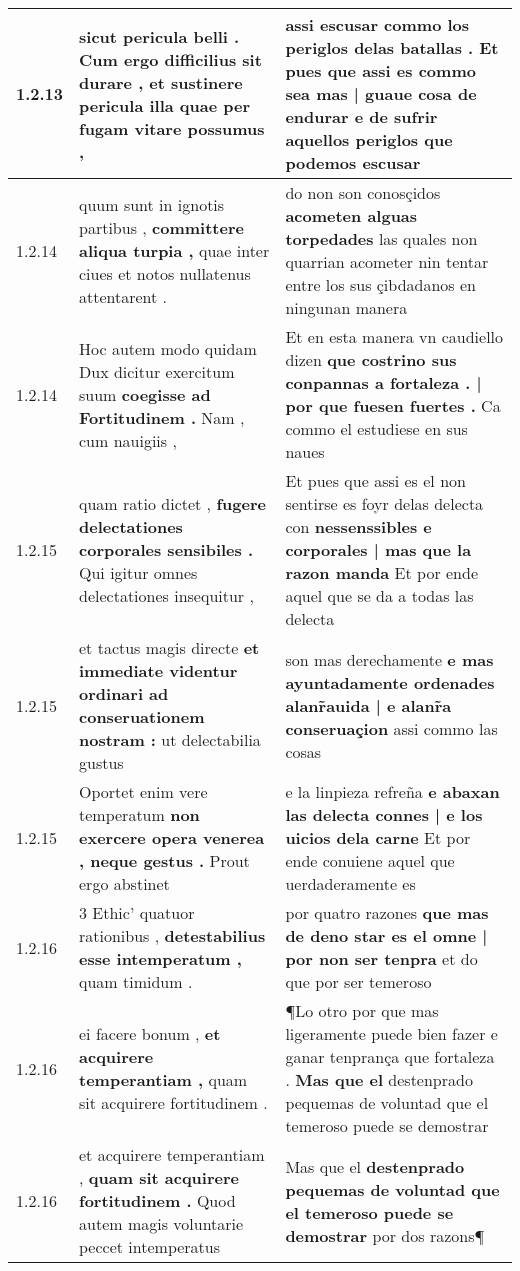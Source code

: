 \begin{tabular}{|p{1cm}|p{6.5cm}|p{6.5cm}|}
1.2.13 & sicut pericula belli . \textbf{ Cum ergo difficilius sit durare , et sustinere pericula illa } quae per fugam vitare possumus , & assi escusar commo los periglos delas batallas . \textbf{ Et pues que assi es commo sea mas | guaue cosa de endurar } e de sufrir aquellos periglos que podemos escusar \\\hline
1.2.14 & quum sunt in ignotis partibus , \textbf{ committere aliqua turpia , } quae inter ciues et notos nullatenus attentarent . & do non son conosçidos \textbf{ acometen alguas torpedades } las quales non quarrian acometer nin tentar entre los sus çibdadanos en ningunan manera \\\hline
1.2.14 & Hoc autem modo quidam Dux dicitur exercitum suum \textbf{ coegisse ad Fortitudinem . } Nam , cum nauigiis , & Et en esta manera vn caudiello dizen \textbf{ que costrino sus conpannas a fortaleza . | por que fuesen fuertes . } Ca commo el estudiese en sus naues \\\hline
1.2.15 & quam ratio dictet , \textbf{ fugere delectationes corporales sensibiles . } Qui igitur omnes delectationes insequitur , & Et pues que assi es el non sentirse es foyr delas delecta con \textbf{ nessenssibles e corporales | mas que la razon manda } Et por ende aquel que se da a todas las delecta \\\hline
1.2.15 & et tactus magis directe \textbf{ et immediate videntur ordinari ad conseruationem nostram : } ut delectabilia gustus & son mas derechamente \textbf{ e mas ayuntadamente ordenades alanr̃auida | e alanr̃a conseruaçion } assi commo las cosas \\\hline
1.2.15 & Oportet enim vere temperatum \textbf{ non exercere opera venerea , neque gestus . } Prout ergo abstinet & e la linpieza refreña \textbf{ e abaxan las delecta connes | e los uicios dela carne } Et por ende conuiene aquel que uerdaderamente es \\\hline
1.2.16 & 3 Ethic’ quatuor rationibus , \textbf{ detestabilius esse intemperatum , } quam timidum . & por quatro razones \textbf{ que mas de deno star es el omne | por non ser tenpra } et do que por ser temeroso \\\hline
1.2.16 & ei facere bonum , \textbf{ et acquirere temperantiam , } quam sit acquirere fortitudinem . & ¶Lo otro por que mas ligeramente puede bien fazer e ganar tenprança que fortaleza . \textbf{ Mas que el } destenprado pequemas de voluntad que el temeroso puede se demostrar \\\hline
1.2.16 & et acquirere temperantiam , \textbf{ quam sit acquirere fortitudinem . } Quod autem magis voluntarie peccet intemperatus & Mas que el \textbf{ destenprado pequemas de voluntad que el temeroso puede se demostrar } por dos razons¶ \\\hline

\end{tabular}
